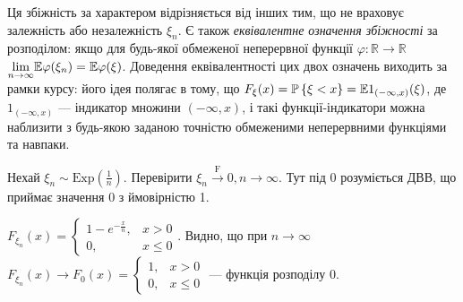 \begin{enumerate}
    Ця збіжність за характером відрізняється від інших тим, що не враховує залежність або незалежність $\xi_n$.
    Є також \emph{еквівалентне означення збіжності} за розподілом: якщо для будь-якої обмеженої неперервної функції $\varphi : \mathbb{R} \to \mathbb{R}$
    $\underset{n \to \infty}{\lim} \mathbb{E} \varphi(\xi_n) = \mathbb{E}\varphi(\xi)$.
    Доведення еквівалентності цих двох означень виходить за рамки курсу: його ідея полягає в тому, що $F_{\xi}(x) = \mathbb{P}\left\{ \xi < x\right\} = \mathbb{E} 1_{(-\infty, x)}(\xi)$,
    де $1_{(-\infty, x)}$ --- індикатор множини $(-\infty, x)$, і такі функції-індикатори можна наблизити з будь-якою заданою точністю обмеженими неперервними функціями та навпаки.
    \begin{example}
        Нехай $\xi_n \sim \mathrm{Exp}(\frac{1}{n})$. Перевірити $\xi_n \overset{\mathrm{F}}{\to} 0, n \to \infty$.
        Тут під 0 розуміється ДВВ, що приймає значення 0 з ймовірністю 1.

        $F_{\xi_n}(x) = \begin{cases}
            1 - e^{-\frac{x}{n}}, & x > 0 \\
            0, & x \leq 0
        \end{cases}$. Видно, що при $n \to \infty$ $F_{\xi_n}(x) \to F_0(x) = \begin{cases}
            1, & x > 0 \\
            0, & x \leq 0
        \end{cases}
        $ --- функція розподілу 0.
    \end{example}
\end{enumerate}

